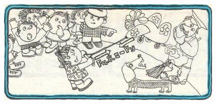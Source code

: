 \newpage

\begin{figure}[H]
\includegraphics[width = 1\textwidth]{image}
\caption {}
\label{fig:pic_1}
\end{figure}

